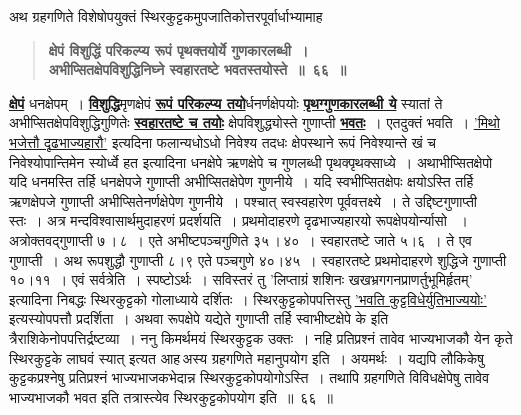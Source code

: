 \documentclass[11pt, openany]{book}
\begin{document}
\begin{sloppypar}
{\small अथ ग्रहगणिते विशेषोपयुक्तं स्थिरकुट्टकमुपजातिकोत्तरपूर्वार्धाभ्यामाह\textendash }

 \label{5.66}
\begin{quote}
{\large \textbf{{\color{purple}क्षेपं विशुद्धिं परिकल्प्य रूपं पृथक्तयोर्ये गुणकारलब्धी~।\\
अभीप्सितक्षेपविशुद्धिनिघ्ने स्वहारतष्टे भवतस्तयोस्ते~॥~६६~॥}}}
\end{quote}

\hyperref[5.66]{\textbf{क्षेपं}} धनक्षेपम्~। \hyperref[5.66]{\textbf{विशुद्धि}}मृणक्षेपं \hyperref[5.66]{\textbf{रूपं परिकल्प्य तयो}}र्धनर्णक्षेपयोः \hyperref[5.66]{\textbf{पृथग्गुणकारलब्धी ये}} स्यातां ते अभीप्सितक्षेपविशुद्धिगुणितेः \hyperref[5.66]{\textbf{स्वहारतष्टे च तयोः}} क्षेपविशुद्ध्योस्ते गुणाप्ती \hyperref[5.66]{\textbf{भवतः}}~। एतदुक्तं भवति~। \hyperref[5.51]{'मिथो भजेत्तौ दृढभाज्यहारौ'} इत्यदिना फलान्यधोऽधो निवेश्य तदधः क्षेपस्थाने रूपं निवेश्यान्ते खं च निवेश्योपान्तिमेन स्योर्ध्वे हत इत्यादिना धनक्षेपे ऋणक्षेपे च गुणलब्धी पृथक्पृथक्साध्ये~। अथाभीप्सितक्षेपो यदि धनमस्ति तर्हि धनक्षेपजे गुणाप्ती अभीप्सितक्षेपेण गुणनीये~। यदि स्वभीप्सितक्षेपः क्षयोऽस्ति तर्हि ऋणक्षेपजे गुणाप्ती अभीप्सितेनर्णक्षेपेण गुणनीये~। पश्चात् स्वस्वहारेण पूर्ववत्तक्ष्ये~। ते उद्दिष्टगुणाप्ती स्तः~। अत्र मन्दविश्वासार्थमुदाहरणं प्रदर्शयति~। प्रथमोदाहरणे दृढभाज्यहारयो रूपक्षेपयोर्न्यासो ~। अत्रोक्तवद्गुणाप्ती ७\,।\,८~। एते अभीष्टपञ्चगुणिते ३५\,।\,४०~। स्वहारतष्टे जाते ५।६~। ते एव गुणाप्ती~। अथ रूपशुद्धौ गुणाप्ती ८।९ एते पञ्चगुणे ४०।४५~। स्वहारतष्टे प्रथमोदाहरणे शुद्धिजे गुणाप्ती १०।११~। एवं सर्वत्रेति~। स्पष्टोऽर्थः~। सविस्तरं तु {\color{violet}'लिप्ताग्रं शशिनः खखभ्रगगनप्राणर्तुभूमिर्हृतम्'} इत्यादिना निबद्धः स्थिरकुट्टको {\color{violet}गोलाध्याये} दर्शितः~। स्थिरकुट्टकोपपत्तिस्तु \hyperref[5.53]{'भवति कुट्टविधेर्युतिभाज्ययोः'} इत्यस्योपपत्तौ प्रदर्शिता~। अथवा रूपक्षेपे यद्येते गुणाप्ती तर्हि स्वाभीष्टक्षेपे के इति त्रैराशिकेनोपपत्तिर्द्रष्टव्या~। ननु किमर्थमयं स्थिरकुट्टक उक्तः~। नहि प्रतिप्रश्नं तावेव भाज्यभाजकौ येन कृते स्थिरकुट्टके लाघवं स्यात् इत्यत आह\textendash \,अस्य ग्रहगणिते महानुपयोग इति~। अयमर्थः~। यद्यपि लौकिकेषु कुट्टकप्रश्नेषु प्रतिप्रश्नं भाज्यभाजकभेदान्न स्थिरकुट्टकोपयोगोऽस्ति~। तथापि ग्रहगणिते विविधक्षेपेषु तावेव भाज्यभाजकौ भवत इति तत्रास्त्येव स्थिरकुट्टकोपयोग इति~॥~६६~॥\\


\end{sloppypar}
\end{document}
